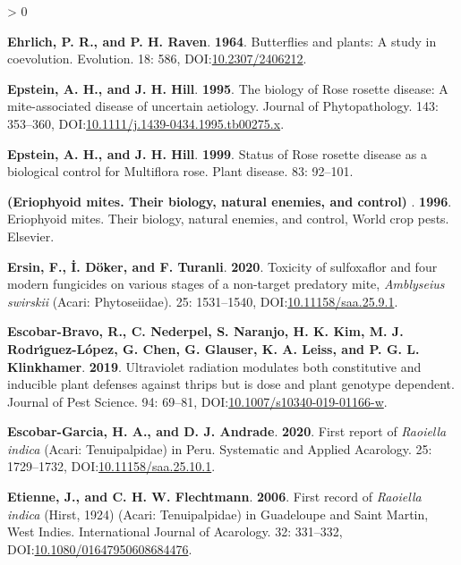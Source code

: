 \documentclass{ufdissertation}[overrideChapters] %
\newlength{\cslhangindent}
\newenvironment{CSLReferences}[2] %
 {%
  \setlength{\parindent}{0pt}
  \ifodd #1 \everypar{\setlength{\hangindent}{\cslhangindent}}\ignorespaces\fi
  \ifnum #2 > 0
  \setlength{\parskip}{#2\baselineskip}
  \fi
 }%
 {}
\begin{document}
{\begin{CSLReferences}{1}{1}
\leavevmode{}%
\textbf{Ehrlich, P. R., and P. H. Raven}. \textbf{1964}. Butterflies and plants: A study in coevolution. Evolution. 18: 586, DOI:\href{https://doi.org/10.2307/2406212}{10.2307/2406212}.

\leavevmode{}%
\textbf{Epstein, A. H., and J. H. Hill}. \textbf{1995}. The biology of {Rose rosette disease}: A mite-associated disease of uncertain aetiology. Journal of Phytopathology. 143: 353--360, DOI:\href{https://doi.org/10.1111/j.1439-0434.1995.tb00275.x}{10.1111/j.1439-0434.1995.tb00275.x}.

\leavevmode{}%
\textbf{Epstein, A. H., and J. H. Hill}. \textbf{1999}. Status of {Rose rosette disease} as a biological control for {Multiflora rose}. Plant disease. 83: 92--101.

\leavevmode{}%
\textbf{(Eriophyoid mites. Their biology, natural enemies, and control) }. \textbf{1996}. Eriophyoid mites. Their biology, natural enemies, and control, World crop pests. Elsevier.

\leavevmode{}%
\textbf{Ersin, F., İ. Döker, and F. Turanli}. \textbf{2020}. Toxicity of sulfoxaflor and four modern fungicides on various stages of a non-target predatory mite, {\emph{Amblyseius swirskii}} ({Acari}: {Phytoseiidae}). 25: 1531--1540, DOI:\href{https://doi.org/10.11158/saa.25.9.1}{10.11158/saa.25.9.1}.

\leavevmode{}%
\textbf{Escobar-Bravo, R., C. Nederpel, S. Naranjo, H. K. Kim, M. J. Rodrı́guez-López, G. Chen, G. Glauser, K. A. Leiss, and P. G. L. Klinkhamer}. \textbf{2019}. Ultraviolet radiation modulates both constitutive and inducible plant defenses against thrips but is dose and plant genotype dependent. Journal of Pest Science. 94: 69--81, DOI:\href{https://doi.org/10.1007/s10340-019-01166-w}{10.1007/s10340-019-01166-w}.

\leavevmode{}%
\textbf{Escobar-Garcia, H. A., and D. J. Andrade}. \textbf{2020}. First report of {\emph{Raoiella indica}} ({Acari}: {Tenuipalpidae}) in {Peru}. Systematic and Applied Acarology. 25: 1729--1732, DOI:\href{https://doi.org/10.11158/saa.25.10.1}{10.11158/saa.25.10.1}.

\leavevmode{}%
\textbf{Etienne, J., and C. H. W. Flechtmann}. \textbf{2006}. First record of {\emph{Raoiella indica}} ({Hirst}, 1924) ({Acari}: {Tenuipalpidae}) in {Guadeloupe} and {Saint Martin}, {West Indies}. International Journal of Acarology. 32: 331--332, DOI:\href{https://doi.org/10.1080/01647950608684476}{10.1080/01647950608684476}.


\end{CSLReferences}}
\end{document}
